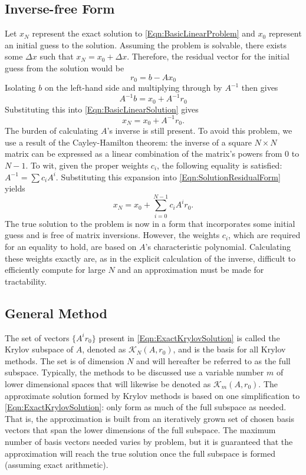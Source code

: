 \documentclass[Prelim,12pt]{WisconsinThesis}
\newcommand{\by}    {\!\times\!}
\begin{document}
\subsection{Inverse-free Form}
Let $x_N$ represent the exact solution to \cref{Eqn:BasicLinearProblem} and $x_0$ represent an initial guess to the solution.
Assuming the problem is solvable, there exists some $\Delta{x}$ such that $x_N = x_0 + \Delta{x}$.
Therefore, the residual vector for the initial guess from the solution would be
\begin{equation}
    r_0 = b - A x_0
\end{equation}
Isolating $b$ on the left-hand side and multiplying through by $A^{-1}$ then gives
\begin{equation}
    A^{-1} b = x_0 + A^{-1} r_0
\end{equation}
Substituting this into \cref{Eqn:BasicLinearSolution} gives
\begin{equation}
    x_N = x_0 + A^{-1} r_0.
    \label{Eqn:SolutionResidualForm}
\end{equation}
The burden of calculating $A$'s inverse is still present.
To avoid this problem, we use a result of the Cayley-Hamilton theorem: the inverse of a square $N \by N$ matrix can be expressed as a linear combination of the matrix's powers from $0$ to $N-1$.
To wit, given the proper weights $c_i$, the following equality is satisfied: $A^{-1} = \sum c_i A^i$.
Substituting this expansion into \cref{Eqn:SolutionResidualForm} yields
\begin{equation}
    x_N = x_0 + \sum_{i = 0}^{N-1} c_i A^i r_0.
    \label{Eqn:ExactKrylovSolution}
\end{equation}
The true solution to the problem is now in a form that incorporates some initial guess and is free of matrix inversions.
However, the weights $c_i$, which are required for an equality to hold, are based on $A$'s characteristic polynomial.
Calculating these weights exactly are, as in the explicit calculation of the inverse, difficult to efficiently compute for large $N$ and an approximation must be made for tractability.


\subsection{General Method}

The set of vectors $\{A^i r_0\}$ present in \cref{Eqn:ExactKrylovSolution} is called the Krylov subspace of $A$, denoted as $\mathcal{K}_N(A,r_0)$, and is the basis for all Krylov methods.
The set is of dimension $N$ and will hereafter be referred to as the full subspace.
Typically, the methods to be discussed use a variable number $m$ of lower dimensional spaces that will likewise be denoted as $\mathcal{K}_m(A,r_0)$.
The approximate solution formed by Krylov methods is based on one simplification to \cref{Eqn:ExactKrylovSolution}: only form as much of the full subspace as needed.
That is, the approximation is built from an iteratively grown set of chosen basis vectors that span the lower dimensions of the full subspace.
The maximum number of basis vectors needed varies by problem, but it is guaranteed that the approximation will reach the true solution once the full subspace is formed (assuming exact arithmetic).
\end{document}
